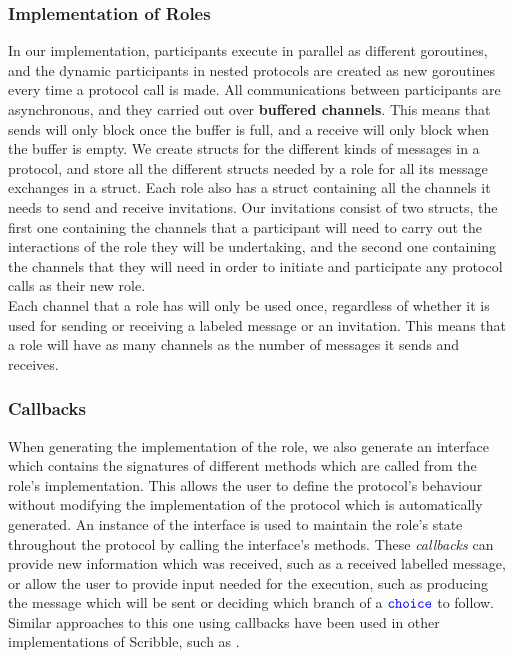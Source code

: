 \documentclass[12pt,twoside]{report}
\begin{document}
\subsubsection{Implementation of Roles}

In our implementation, participants execute in parallel as different goroutines, and the dynamic participants in nested protocols are created as new goroutines every time a protocol call is made. All communications between participants are asynchronous, and they carried out over \textbf{buffered channels}. This means that sends will only block once the buffer is full, and a receive will only block when the buffer is empty. We create structs for the different kinds of messages in a protocol, and store all the different structs needed by a role for all its message exchanges in a struct. Each role also has a struct containing all the channels it needs to send and receive invitations. Our invitations consist of two structs, the first one containing the channels that a participant will need to carry out the interactions of the role they will be undertaking, and the second one containing the channels that they will need in order to initiate and participate any protocol calls as their new role. \\

Each channel that a role has will only be used once, regardless of whether it is used for sending or receiving a labeled message or an invitation. This means that a role will have as many channels as the number of messages it sends and receives.

\subsubsection{Callbacks}
When generating the implementation of the role, we also generate an interface which contains the signatures of different methods which are called from the role's implementation. This allows the user to define the protocol's behaviour without modifying the implementation of the protocol which is automatically generated. An instance of the interface is used to maintain the role's state throughout the protocol by calling the interface's methods. These \textit{callbacks} can provide new information which was received, such as a received labelled message, or allow the user to provide input needed for the execution, such as producing the message which will be sent or deciding which branch of a ${\color{blue}\mathtt{choice}}$ to follow. Similar approaches to this one using callbacks have been used in other implementations of Scribble, such as \cite{scribble-callbacks}.
\end{document}

